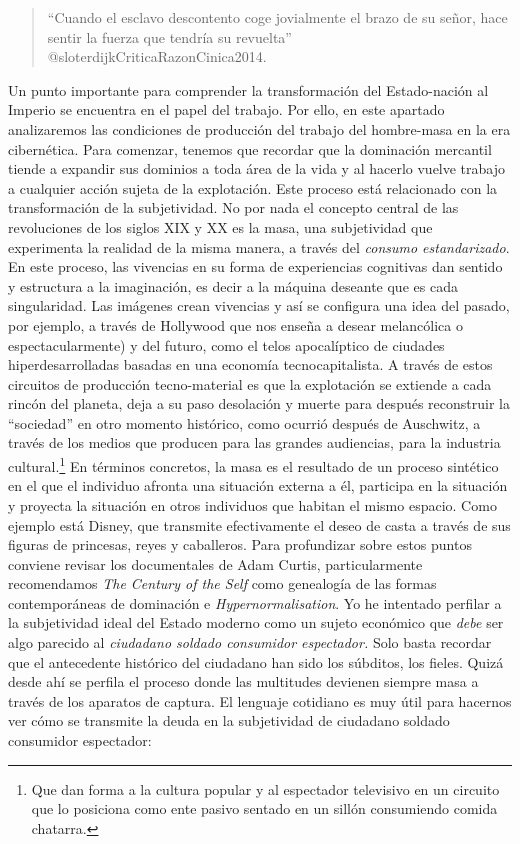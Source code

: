 \documentclass[
]{article}
\begin{document}
\begin{quote}
``Cuando el esclavo descontento coge jovialmente el brazo de su señor,
hace sentir la fuerza que tendría su revuelta''
@sloterdijkCriticaRazonCinica2014.
\end{quote}

Un punto importante para comprender la transformación del Estado-nación
al Imperio se encuentra en el papel del trabajo. Por ello, en este
apartado analizaremos las condiciones de producción del trabajo del
hombre-masa en la era cibernética. Para comenzar, tenemos que recordar
que la dominación mercantil tiende a expandir sus dominios a toda área
de la vida y al hacerlo vuelve trabajo a cualquier acción sujeta de la
explotación. Este proceso está relacionado con la transformación de la
subjetividad. No por nada el concepto central de las revoluciones de los
siglos XIX y XX es la masa, una subjetividad que experimenta la realidad
de la misma manera, a través del \emph{consumo estandarizado}. En este
proceso, las vivencias en su forma de experiencias cognitivas dan
sentido y estructura a la imaginación, es decir a la máquina deseante
que es cada singularidad. Las imágenes crean vivencias y así se
configura una idea del pasado, por ejemplo, a través de Hollywood que
nos enseña a desear melancólica o espectacularmente) y del futuro, como
el telos apocalíptico de ciudades hiperdesarrolladas basadas en una
economía tecnocapitalista. A través de estos circuitos de producción
tecno-material es que la explotación se extiende a cada rincón del
planeta, deja a su paso desolación y muerte para después reconstruir la
``sociedad'' en otro momento histórico, como ocurrió después de
Auschwitz, a través de los medios que producen para las grandes
audiencias, para la industria cultural.\footnote{Que dan forma a la
  cultura popular y al espectador televisivo en un circuito que lo
  posiciona como ente pasivo sentado en un sillón consumiendo comida
  chatarra.} En términos concretos, la masa es el resultado de un
proceso sintético en el que el individuo afronta una situación externa a
él, participa en la situación y proyecta la situación en otros
individuos que habitan el mismo espacio. Como ejemplo está Disney, que
transmite efectivamente el deseo de casta a través de sus figuras de
princesas, reyes y caballeros. Para profundizar sobre estos puntos
conviene revisar los documentales de Adam Curtis, particularmente
recomendamos \emph{The Century of the Self} como genealogía de las
formas contemporáneas de dominación e \emph{Hypernormalisation}. Yo he
intentado perfilar a la subjetividad ideal del Estado moderno como un
sujeto económico que \emph{debe} ser algo parecido al \emph{ciudadano
soldado consumidor espectador.} Solo basta recordar que el antecedente
histórico del ciudadano han sido los súbditos, los fieles. Quizá desde
ahí se perfila el proceso donde las multitudes devienen siempre masa a
través de los aparatos de captura. El lenguaje cotidiano es muy útil
para hacernos ver cómo se transmite la deuda en la subjetividad de
ciudadano soldado consumidor espectador:
\end{document}
